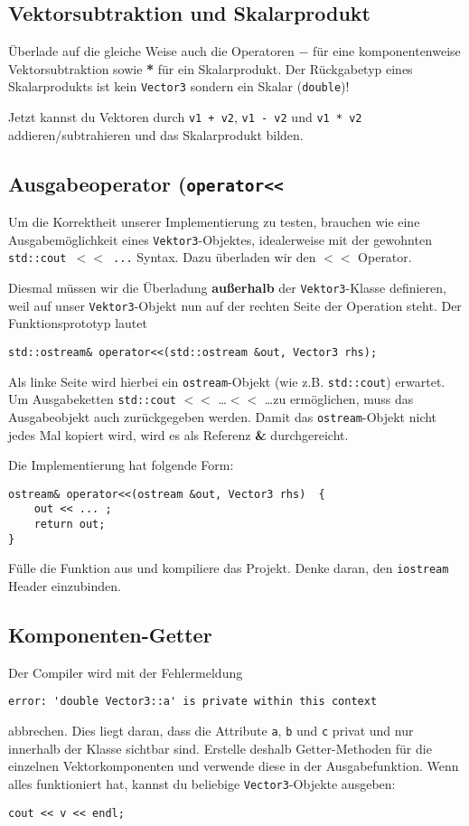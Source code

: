 \subsection{Vektorsubtraktion und Skalarprodukt}%
Überlade auf die gleiche Weise auch die Operatoren $-$ für eine komponentenweise Vektorsubtraktion sowie \textbf{*} für ein Skalarprodukt.
Der Rückgabetyp eines Skalarprodukts ist kein \texttt{Vector3} sondern ein Skalar (\texttt{double})!

Jetzt kannst du Vektoren durch \texttt{v1 + v2}, \texttt{v1 - v2} und \texttt{v1 * v2} addieren/subtrahieren und das Skalarprodukt bilden.

\subsection{Ausgabeoperator (\texttt{operator<<}}
Um die Korrektheit unserer Implementierung zu testen, brauchen wie eine Ausgabemöglichkeit eines \texttt{Vektor3}-Objektes, idealerweise mit der gewohnten \texttt{std::cout $<<$ ...} Syntax.
Dazu überladen wir den $<<$ Operator.

Diesmal müssen wir die Überladung \textbf{außerhalb} der \texttt{Vektor3}-Klasse definieren, weil auf unser \texttt{Vektor3}-Objekt nun auf der rechten Seite der Operation steht. Der Funktionsprototyp lautet
\begin{lstlisting}
std::ostream& operator<<(std::ostream &out, Vector3 rhs);
\end{lstlisting}

Als linke Seite wird hierbei ein \texttt{ostream}-Objekt (wie z.B. \texttt{std::cout}) erwartet.
Um Ausgabeketten \texttt{std::cout} $<<$ \dots $<<$ \dots zu ermöglichen, muss das Ausgabeobjekt auch zurückgegeben werden. Damit das \texttt{ostream}-Objekt nicht jedes Mal kopiert wird, wird es als Referenz \textbf{\&} durchgereicht.

Die Implementierung hat folgende Form:
\begin{lstlisting}
ostream& operator<<(ostream &out, Vector3 rhs)  {
	out << ... ;
	return out;
}
\end{lstlisting}

Fülle die Funktion aus und kompiliere das Projekt.
Denke daran, den \texttt{iostream} Header einzubinden.

\subsection{Komponenten-Getter}
Der Compiler wird mit der Fehlermeldung
\begin{verbatim}
error: 'double Vector3::a' is private within this context
\end{verbatim}
abbrechen.
Dies liegt daran, dass die Attribute \texttt{a}, \texttt{b} und \texttt{c} privat und nur innerhalb der Klasse sichtbar sind.
Erstelle deshalb Getter-Methoden für die einzelnen Vektorkomponenten und verwende diese in der Ausgabefunktion.
Wenn alles funktioniert hat, kannst du beliebige \texttt{Vector3}-Objekte ausgeben:
\begin{lstlisting}
cout << v << endl;
\end{lstlisting} 

